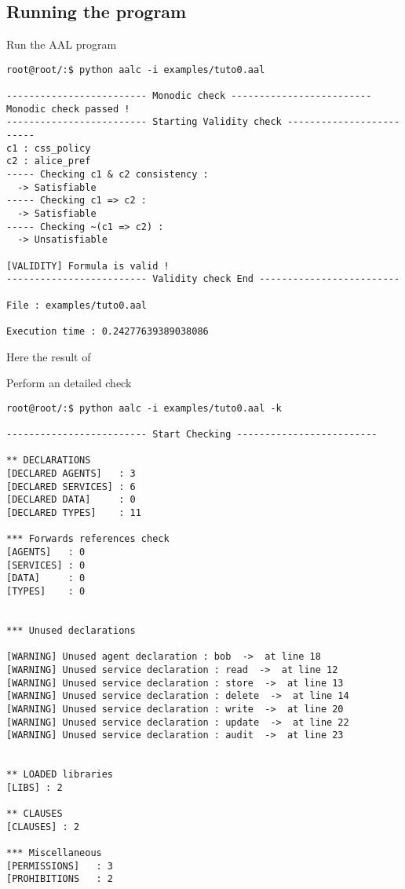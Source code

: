 \subsection{Running the program}

\begin{itemize}
	\item Run the AAL program
{\lstset{style=shell}
\begin{lstlisting}
root@root/:$ python aalc -i examples/tuto0.aal

------------------------- Monodic check -------------------------
Monodic check passed !
------------------------- Starting Validity check -------------------------
c1 : css_policy
c2 : alice_pref
----- Checking c1 & c2 consistency :
  -> Satisfiable
----- Checking c1 => c2 :
  -> Satisfiable
----- Checking ~(c1 => c2) :
  -> Unsatisfiable

[VALIDITY] Formula is valid !
------------------------- Validity check End -------------------------

File : examples/tuto0.aal

Execution time : 0.24277639389038086
\end{lstlisting}

Here the result of

	\item Perform an detailed check
\begin{lstlisting}
root@root/:$ python aalc -i examples/tuto0.aal -k

------------------------- Start Checking -------------------------

** DECLARATIONS
[DECLARED AGENTS]   : 3
[DECLARED SERVICES] : 6
[DECLARED DATA]     : 0
[DECLARED TYPES]    : 11

*** Forwards references check
[AGENTS]   : 0
[SERVICES] : 0
[DATA]     : 0
[TYPES]    : 0


*** Unused declarations

[WARNING] Unused agent declaration : bob  ->  at line 18
[WARNING] Unused service declaration : read  ->  at line 12
[WARNING] Unused service declaration : store  ->  at line 13
[WARNING] Unused service declaration : delete  ->  at line 14
[WARNING] Unused service declaration : write  ->  at line 20
[WARNING] Unused service declaration : update  ->  at line 22
[WARNING] Unused service declaration : audit  ->  at line 23


** LOADED libraries
[LIBS] : 2

** CLAUSES
[CLAUSES] : 2

*** Miscellaneous
[PERMISSIONS]   : 3
[PROHIBITIONS   : 2


\end{lstlisting}}
\end{itemize}
